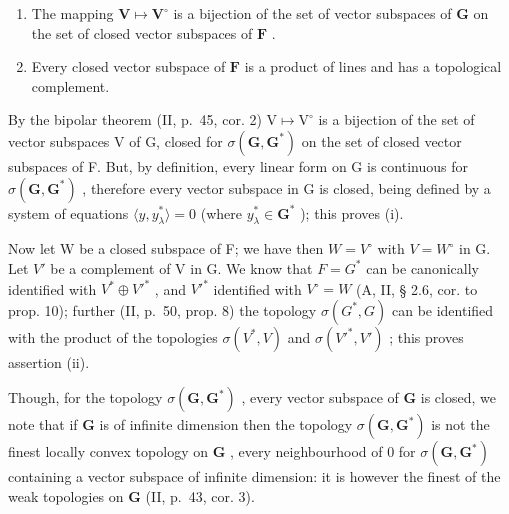 \begin{enumerate}
\def\labelenumi{(\roman{enumi})}
\item
  The mapping \(\mathbf{V} \mapsto \mathbf{V}^{\circ}\) is a bijection of the set of vector subspaces of \(\mathbf{G}\) on the set of closed vector subspaces of \(\mathbf{F}\) .
\item
  Every closed vector subspace of \(\mathbf{F}\) is a product of lines and has a topological complement.
\end{enumerate}

By the bipolar theorem (II, p.~45, cor. 2) \(\mathrm{V} \mapsto \mathrm{V}^{\circ}\) is a bijection of the set of vector subspaces V of G, closed for \(\sigma(\mathbf{G}, \mathbf{G}^{*})\) on the set of closed vector subspaces of F. But, by definition, every linear form on G is continuous for \(\sigma(\mathbf{G}, \mathbf{G}^{*})\) , therefore every vector subspace in G is closed, being defined by a system of equations \(\langle y, y_{\lambda}^{*} \rangle = 0\) (where \(y_{\lambda}^{*} \in \mathbf{G}^{*}\) ); this proves (i).

Now let W be a closed subspace of F; we have then \(W = V^{\circ}\) with \(V = W^{\circ}\) in G. Let \(V'\) be a complement of V in G. We know that \(F = G^{*}\) can be canonically identified with \(V^{*} \oplus V'^{*}\) , and \(V'^{*}\) identified with \(V^{\circ} = W\) (A, II, § 2.6, cor. to prop. 10); further (II, p.~50, prop. 8) the topology \(\sigma(G^{*}, G)\) can be identified with the product of the topologies \(\sigma(V^{*}, V)\) and \(\sigma(V'^{*}, V')\) ; this proves assertion (ii).

Though, for the topology \(\sigma(\mathbf{G},\mathbf{G}^{*})\) , every vector subspace of \(\mathbf{G}\) is closed, we note that if \(\mathbf{G}\) is of infinite dimension then the topology \(\sigma(\mathbf{G},\mathbf{G}^{*})\) is not the finest locally convex topology on \(\mathbf{G}\) , every neighbourhood of 0 for \(\sigma(\mathbf{G},\mathbf{G}^{*})\) containing a vector subspace of infinite dimension: it is however the finest of the weak topologies on \(\mathbf{G}\) (II, p.~43, cor. 3).


